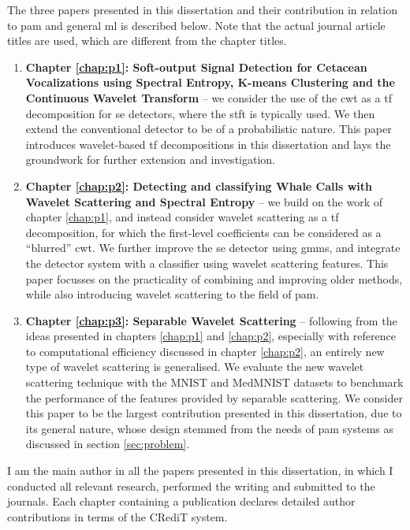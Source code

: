 The three papers presented in this dissertation and their contribution in relation to \ac{pam} and general \ac{ml} is described below. Note that the actual journal article titles are used, which are different from the chapter titles.

\clearpage
\begin{enumerate}
    \item \textbf{Chapter \ref*{chap:p1}: Soft-output Signal Detection for Cetacean Vocalizations using Spectral Entropy, K-means Clustering and the Continuous Wavelet Trans\-form} -- we consider the use of the \ac{cwt} as a \ac{tf} decomposition for \ac{se} detectors, where the \ac{stft} is typically used. We then extend the conventional detector to be of a probabilistic nature. This paper introduces wavelet-based \ac{tf} decompositions in this dissertation and lays the groundwork for further extension and investigation.
    \item \textbf{Chapter \ref*{chap:p2}: Detecting and classifying Whale Calls with Wavelet Scatter\-ing and Spectral Entropy} -- we build on the work of chapter \ref*{chap:p1}, and instead consider wavelet scattering as a \ac{tf} decomposition, for which the first-level coeffi\-cients can be considered as a ``blurred'' \ac{cwt}. We further improve the \ac{se} detector using \acfp{gmm}, and integrate the detector system with a classifier using wavelet scattering features. This paper focusses on the practicality of combining and improving older methods, while also introducing wavelet scattering to the field of \ac{pam}.
    \item \textbf{Chapter \ref*{chap:p3}: Separable Wavelet Scattering} -- following from the ideas presented in chapters \ref*{chap:p1} and \ref*{chap:p2}, especially with reference to computational efficiency discussed in chapter \ref*{chap:p2}, an entirely new type of wavelet scattering is generalised. We evaluate the new wavelet scattering technique with the MNIST and MedMNIST datasets to benchmark the performance of the features provided by separable scattering. We consider this paper to be the largest contribution presented in this dissertation, due to its general nature, whose design stemmed from the needs of \ac{pam} systems as discussed in section \ref*{sec:problem}.
\end{enumerate}

I am the main author in all the papers presented in this dissertation, in which I conducted all relevant research, performed the writing and submitted to the journals. Each chapter containing a publication declares detailed author contributions in terms of the CRediT system.

